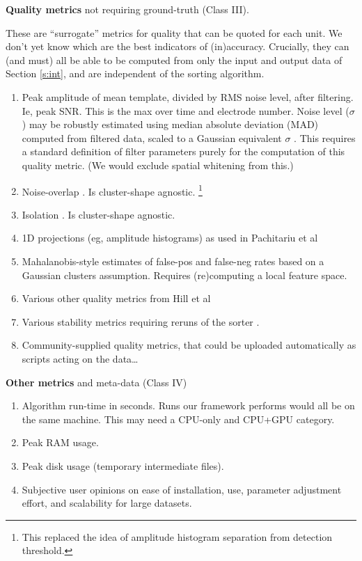 \documentclass[10pt]{article}
\newcommand{\ben}{\begin{enumerate}}
\newcommand{\een}{\end{enumerate}}
\begin{document}
\item {\bf Quality metrics} not requiring ground-truth (Class III).
  
  These are ``surrogate'' metrics for quality that
  can be quoted for each unit. We don't yet know which are the best indicators of
  (in)accuracy.
  Crucially, they
  can (and must) all be able to be
  computed from only the input and output data of Section \eqref{s:int},
  and are independent of the sorting algorithm.
  \ben
\item Peak amplitude of mean template, divided by RMS noise level,
  after filtering.
  Ie, peak SNR. This is the max over time and electrode number.
  Noise level ($\sigma$)
  may be robustly estimated using median absolute deviation (MAD) computed
  from filtered data,
  scaled to a Gaussian equivalent $\sigma$ \cite[(3.1)]{spc}.
  This requires a standard definition of filter parameters purely for the
  computation of this quality metric.
  (We would exclude spatial whitening from this.)
\item Noise-overlap \cite{mountainsort}. Is cluster-shape agnostic.
  \footnote{This replaced the idea of amplitude histogram separation from detection threshold.}
\item Isolation \cite{mountainsort}. Is cluster-shape agnostic.
\item 1D projections (eg, amplitude histograms) as used in Pachitariu et al \cite{kilosort}
\item Mahalanobis-style estimates of false-pos and false-neg rates
  based on a Gaussian clusters assumption. Requires (re)computing a local
  feature space.
  \item Various other quality metrics from Hill et al \cite{Hill2011}
  \item Various stability metrics requiring reruns of the sorter \cite{validspike}.
\item Community-supplied quality metrics, that could be uploaded automatically as scripts acting on the data\ldots
  \een

\item {\bf Other metrics} and meta-data (Class IV)
  \ben
\item Algorithm run-time in seconds. Runs our framework performs would
  all be on the same machine.
  This may need a CPU-only and CPU+GPU category.
\item Peak RAM usage.
\item Peak disk usage (temporary intermediate files).
\item Subjective user opinions on ease of installation, use, parameter adjustment effort, and scalability for large datasets.
  \een
  
\end{document}
